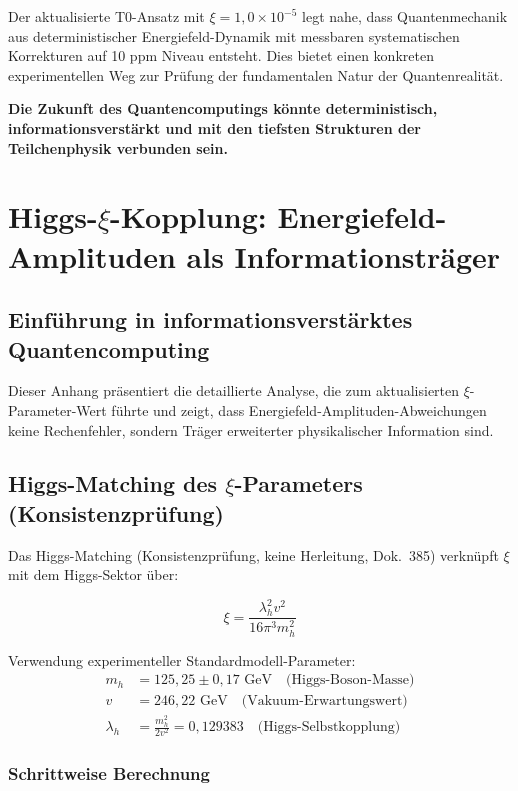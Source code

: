 	Der aktualisierte T0-Ansatz mit $\xi = 1,0 \times 10^{-5}$ legt nahe, dass Quantenmechanik aus deterministischer Energiefeld-Dynamik mit messbaren systematischen Korrekturen auf 10 ppm Niveau entsteht. Dies bietet einen konkreten experimentellen Weg zur Prüfung der fundamentalen Natur der Quantenrealität.
	
	\textbf{Die Zukunft des Quantencomputings könnte deterministisch, informationsverstärkt und mit den tiefsten Strukturen der Teilchenphysik verbunden sein.}
	
	\appendix
	
	\section{Higgs-$\xi$-Kopplung: Energiefeld-Amplituden als Informationsträger}
	
	\subsection{Einführung in informationsverstärktes Quantencomputing}
	
	Dieser Anhang präsentiert die detaillierte Analyse, die zum aktualisierten $\xi$-Parameter-Wert führte und zeigt, dass Energiefeld-Amplituden-Abweichungen keine Rechenfehler, sondern Träger erweiterter physikalischer Information sind.
	
	\subsection{Higgs-Matching des $\xi$-Parameters (Konsistenzprüfung)}
	
	Das Higgs-Matching (Konsistenzprüfung, keine Herleitung, Dok.~385) verknüpft $\xi$ mit dem Higgs-Sektor über:
	
	\begin{equation}
		\xi = \frac{\lambda_h^2 v^2}{16\pi^3 m_h^2}
		\label{eq:higgs_xi_appendix}
	\end{equation}
	
	Verwendung experimenteller Standardmodell-Parameter:
	\begin{align}
		m_h &= 125,25 \pm 0,17 \text{ GeV} \quad \text{(Higgs-Boson-Masse)} \\
		v &= 246,22 \text{ GeV} \quad \text{(Vakuum-Erwartungswert)} \\
		\lambda_h &= \frac{m_h^2}{2v^2} = 0,129383 \quad \text{(Higgs-Selbstkopplung)}
	\end{align}
	
	\subsubsection{Schrittweise Berechnung}
	
